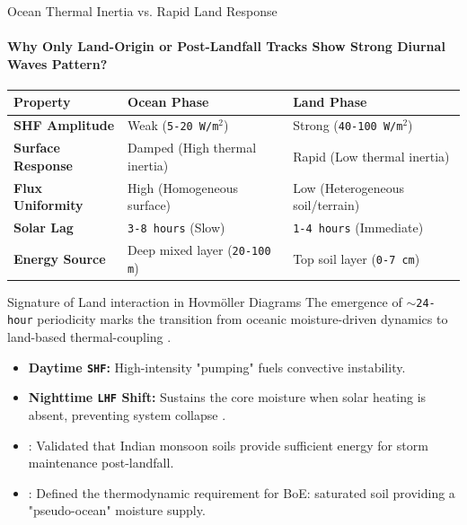 \documentclass[8pt, aspectratio=169]{beamer}
\begin{document}
\begin{frame}{Ocean Thermal Inertia vs. Rapid Land Response}
    \framesubtitle{Why Only Land-Origin or Post-Landfall Tracks Show Strong Diurnal Waves Pattern?}

    \footnotesize
    \begin{center}
        \begin{tabular}{p{2cm} | p{3.5cm} | p{3.5cm}}
            \toprule
            \textbf{Property} & \textbf{Ocean Phase} & \textbf{Land Phase} \\
            \midrule
            \textbf{SHF Amplitude} & Weak (\texttt{5-20 W/m$^2$}) & Strong (\texttt{40-100 W/m$^2$}) \\
            \textbf{Surface Response} & Damped (High thermal inertia) & Rapid (Low thermal inertia) \\
            \textbf{Flux Uniformity} & High (Homogeneous surface) & Low (Heterogeneous soil/terrain) \\
            \textbf{Solar Lag} & \texttt{3-8 hours} (Slow) & \texttt{1-4 hours} (Immediate) \\
            \textbf{Energy Source} & Deep mixed layer (\texttt{20-100 m}) & Top soil layer (\texttt{0-7 cm}) \\
            \bottomrule
        \end{tabular}
    \end{center}

    \begin{block}{Signature of Land interaction in Hovm\"oller Diagrams}
        The emergence of \texttt{$\sim$24-hour} periodicity marks the transition from oceanic moisture-driven dynamics to land-based thermal-coupling \cite{nair2011influence}.
        \begin{itemize}
            \item \textbf{Daytime \texttt{SHF}:} High-intensity "pumping" fuels convective instability.
            \item \textbf{Nighttime \texttt{LHF} Shift:} Sustains the core moisture when solar heating is absent, preventing system collapse \cite{andersen2014insights}.
        \end{itemize}
    \end{block}

    \vfill
    \noindent\makebox[\linewidth]{\rule{\paperwidth}{0.4pt}}
    \vspace{-0.2cm}
    \tiny
    \begin{itemize}
        \item \cite{kishtawal2013tropical} : Validated that Indian monsoon soils provide sufficient energy for storm maintenance post-landfall.
        \item \cite{andersen2014insights} : Defined the thermodynamic requirement for BoE: saturated soil providing a "pseudo-ocean" moisture supply.
    \end{itemize}
\end{frame}
\end{document}

